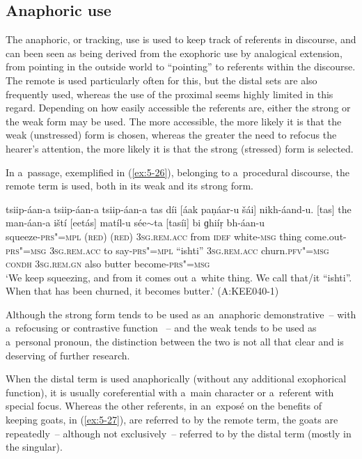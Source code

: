 \subsection{Anaphoric use}
\label{subsec:5-2-4}

The anaphoric, or tracking, use is used to keep track of referents in discourse, and can been seen as being derived from the exophoric use by analogical extension, from pointing in the outside world to ``pointing'' to referents within the discourse. The remote is used particularly often for this, but the distal sets are also frequently used, whereas the use of the proximal seems highly limited in this regard. Depending on how easily accessible the referents are, either the strong or the weak form may be used. The more accessible, the more likely it is that the weak (unstressed) form is chosen, whereas the greater the need to refocus the hearer's attention, the more likely it is that the strong (stressed) form is selected. 


In a~passage, exemplified in (\ref{ex:5-26}), belonging to a~procedural discourse, the remote term is used, both in its weak and its strong form.


\begin{exe}
\ex
\label{ex:5-26}
\gll tsiip-áan-a tsiip-áan-a tsiip-áan-a tas díi [áak paṇáar-u
 šái] nikh-áand-u. [tas] the man-áan-a iští [eetás] matíl-u
sée$\sim$ta [tasíi] bi ɡhiíṛ bh-áan-u \\
squeeze-\textsc{prs"=mpl} (\textsc{red}) (\textsc{red}) \textsc{3}\textsc{sg.rem.acc} from
\textsc{idef} white-\textsc{msg} thing come.out-\textsc{prs"=msg} \textsc{3sg}.\textsc{rem.acc}
to say-\textsc{prs"=mpl} ``ishti'' \textsc{3sg}.\textsc{rem.acc} churn.\textsc{pfv"=msg}
\textsc{condh} \textsc{3sg}.\textsc{rem.gn} also butter become-\textsc{prs"=msg}\\
\glt `We keep squeezing, and from it comes out a~white thing. We call that/it ``ishti''. When that has been
churned, it becomes butter.' (A:KEE040-1)
\end{exe}

Although the strong form tends to be used as an~anaphoric demonstrative~-- with a~refocusing or contrastive function \citep[432]{diessel2006}~-- and the weak tends to be used as a~personal pronoun, the distinction between the two is not all that clear and is deserving of further research.

When the distal term is used anaphorically (without any additional exophorical function), it is usually coreferential with a~main character or a~referent with special focus. Whereas the other referents, in an~exposé on the benefits of keeping goats, in (\ref{ex:5-27}), are referred to by the remote term, the goats are repeatedly~-- although not exclusively~-- referred to by the distal term (mostly in the singular). 

